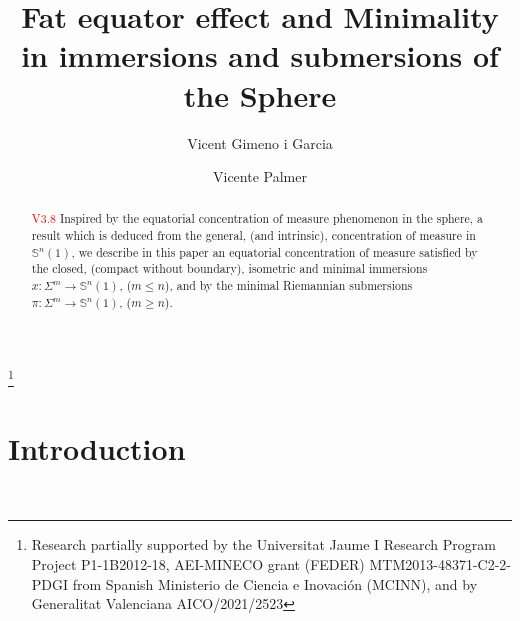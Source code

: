 \documentclass[11pt,letterpaper]{amsart}
\theoremstyle{definition}
\theoremstyle{remark}
\newcommand{\ese}{\mathbb{S}}
\begin{document}
\title[Fat equator effect and minimality]{Fat equator effect and Minimality in immersions and submersions of the Sphere}





\author{Vicent Gimeno i Garcia}
\address{Department of Mathematics, Universitat Jaume I-IMAC,   E-12071, 
Castell\'{o}, Spain}
\author{Vicente Palmer}
\address{Department of Mathematics, Universitat Jaume I-INIT,   E-12071, 
Castell\'{o}, Spain}

\thanks{Research partially supported by  the Universitat Jaume I Research Program Project P1-1B2012-18, AEI-MINECO grant (FEDER) MTM2013-48371-C2-2-PDGI from Spanish Ministerio de Ciencia e Inovaci\'{o}n (MCINN), and by Generalitat Valenciana AICO/2021/2523}





\dedicatory{}



\begin{abstract}\textcolor{red}{V3.8}
Inspired by the equatorial concentration of measure phenomenon in the sphere, a result which is deduced from the general, (and intrinsic), concentration of measure in $\ese^n(1)$, we describe in this paper an equatorial concentration of measure satisfied by the closed, (compact without boundary), isometric and minimal immersions $x:\Sigma^m \rightarrow \ese^n(1)$, ($m \leq n$), and by the minimal Riemannian submersions $\pi: \Sigma^m \rightarrow \ese^n(1)$, ($m \geq n$).\end{abstract}

\maketitle

\section{Introduction}\label{sec:intro}\
\end{document}

